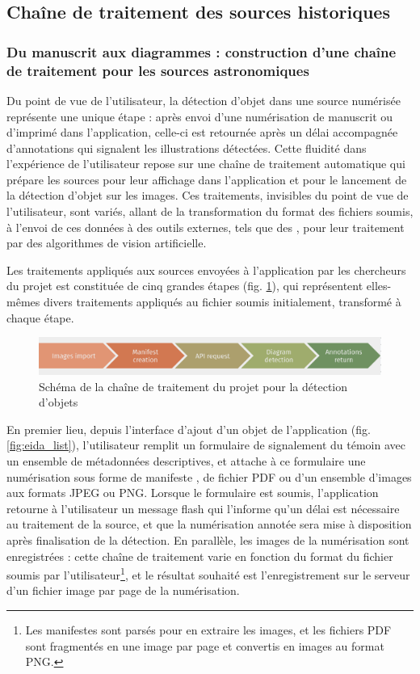 
\subsection{Chaîne de traitement des sources historiques}
    \subsubsection{Du manuscrit aux diagrammes : construction d'une chaîne de traitement pour les sources astronomiques}
	Du point de vue de l'utilisateur, la détection d'objet dans une source numérisée représente une unique étape : après envoi d'une numérisation de manuscrit ou d'imprimé dans l'application, celle-ci est retournée après un délai accompagnée d'annotations qui signalent les illustrations détectées. Cette fluidité dans l'expérience de l'utilisateur repose sur une chaîne de traitement automatique qui prépare les sources pour leur affichage dans l'application et pour le lancement de la détection d'objet sur les images. Ces traitements, invisibles du point de vue de l'utilisateur, sont variés, allant de la transformation du format des fichiers soumis, à l'envoi de ces données à des outils externes, tels que des \api, pour leur traitement par des algorithmes de vision artificielle.
	
	Les traitements appliqués aux sources envoyées à l'application par les chercheurs du projet \eida est constituée de cinq grandes étapes (fig. \ref{fig:detection_workflow}), qui représentent elles-mêmes divers traitements appliqués au fichier soumis initialement, transformé à chaque étape. 
	
	\begin{figure}[h]
		\centering
		\includegraphics[width=16cm]{images/detection_workflow.png}
		\caption{Schéma de la chaîne de traitement du projet \eida pour la détection d'objets}
		\label{fig:detection_workflow}
	\end{figure}

	En premier lieu, depuis l'interface d'ajout d'un objet de l'application \eida (fig. \ref{fig:eida_list}), l'utilisateur remplit un formulaire de signalement du témoin avec un ensemble de métadonnées descriptives, et attache à ce formulaire une numérisation sous forme de manifeste \iiif, de fichier PDF ou d'un ensemble d'images aux formats JPEG ou PNG. Lorsque le formulaire est soumis, l'application retourne à l'utilisateur un message flash qui l'informe qu'un délai est nécessaire au traitement de la source, et que la numérisation annotée sera mise à disposition après finalisation de la détection. En parallèle, les images de la numérisation sont enregistrées : cette chaîne de traitement varie en fonction du format du fichier soumis par l'utilisateur\footnote{Les manifestes \iiif sont parsés pour en extraire les images, et les fichiers PDF sont fragmentés en une image par page et convertis en images au format PNG.}, et le résultat souhaité est l'enregistrement sur le serveur d'un fichier image par page de la numérisation.
	
